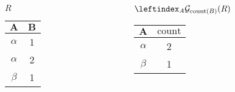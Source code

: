 \documentclass[11pt]{beamer}
\begin{document}
  \begin{frame}
    \begin{columns}[T]
      \begin{column}{0.4\textwidth}
        \centering $R$
        \bigskip \\
        \begin{tabular}{||c|c||}
          \hline
          $\textbf{A}$ & $\textbf{B}$ \\[0.5ex] \hline\hline
          $\alpha$ & 1 \\ \hline
          $\alpha$ & 2 \\ \hline
          $\beta$ & 1 \\ \hline
        \end{tabular}
      \end{column}
      \begin{column}{0.6\textwidth}
        \centering $\leftindex_{A}{\mathcal{G}}_{\mathrm{count}(B)} (R)$
        \medskip \\
        \begin{tabular}{||c|c||}
          \hline
          $\textbf{A}$ & $\mathrm{count}$ \\[0.5ex] \hline\hline
          $\alpha$ & 2 \\ \hline
          $\beta$ & 1 \\ \hline
        \end{tabular}
      \end{column}
    \end{columns}
  \end{frame}
\end{document}
